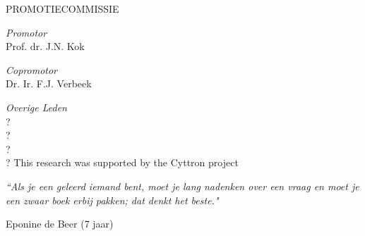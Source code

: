 \documentclass[11pt, a4paper]{Thesis} %
\begin{document}
\begin{titlepage}
PROMOTIECOMMISSIE

\textit{Promotor}\\
Prof. dr. J.N. Kok

\textit{Copromotor}\\
Dr. Ir. F.J. Verbeek

\textit{Overige Leden}\\
?\\
?\\
?\\
?
\vfill
This research was supported by the Cyttron project
\end{titlepage}

\clearpage %



\pagestyle{empty} %





\pagestyle{empty} %

\null\vfill %

\textit{``Als je een geleerd iemand bent, moet je lang nadenken over een vraag en moet je een zwaar boek erbij pakken; dat denkt het beste."}

\begin{flushright}
Eponine de Beer (7 jaar)
\end{flushright}

\vfill\vfill\vfill\vfill\vfill\vfill\null %

\clearpage %
\end{document}
